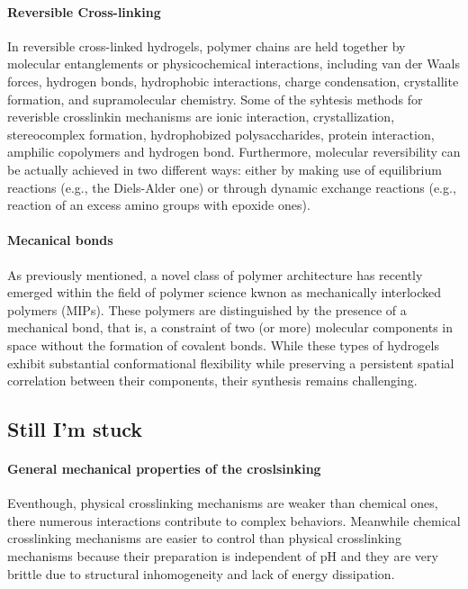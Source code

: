 \paragraph{Reversible Cross-linking}
In reversible cross-linked hydrogels, polymer chains are held together by molecular entanglements or physicochemical interactions, including van der Waals forces, hydrogen bonds, hydrophobic interactions, charge condensation, crystallite formation, and supramolecular chemistry\citep{bustamantetorresHydrogelsClassificationAccording2021,maitraCrosslinkingHydrogelsReview2014}.
Some of the syhtesis methods for reverisble crosslinkin mechanisms are ionic interaction, crystallization, stereocomplex formation, hydrophobized polysaccharides, protein interaction, amphilic copolymers and hydrogen bond\citep{maitraCrosslinkingHydrogelsReview2014,bustamantetorresHydrogelsClassificationAccording2021}.
Furthermore, molecular reversibility can be actually achieved in two different ways: either by making use of equilibrium reactions (e.g., the Diels-Alder one) or through dynamic exchange reactions (e.g., reaction of an excess amino groups with epoxide ones)\citep{picchioniHydrogelsBasedDynamic2018}. 


\paragraph{Mecanical bonds}
As previously mentioned, a novel class of polymer architecture has recently emerged within the field of polymer science kwnon as mechanically interlocked polymers (MIPs). 
These polymers are distinguished by the presence of a mechanical bond, that is, a constraint of two (or more) molecular components in space without the formation of covalent bonds\citep{hartMaterialPropertiesApplications2021}.
While these types of hydrogels exhibit substantial conformational flexibility while preserving a persistent spatial correlation between their components, their synthesis remains challenging.

\subsection{Still I'm stuck}\label{ch1:MechRepsonse}

\paragraph{General mechanical properties of the croslsinking}
Eventhough, physical crosslinking mechanisms are weaker than chemical ones, there numerous interactions contribute to complex behaviors.
Meanwhile chemical crosslinking mechanisms are easier to control than physical crosslinking mechanisms because their preparation is independent of pH\citep{bustamantetorresHydrogelsClassificationAccording2021} and they are very brittle due to structural inhomogeneity and lack of energy dissipation\citep{xuRoleChemicalPhysical2018}.


